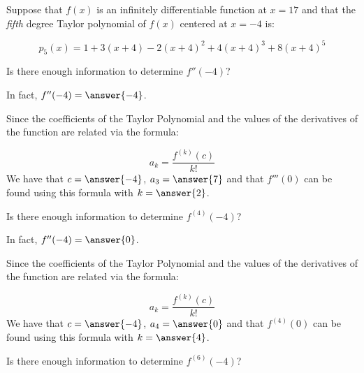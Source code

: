 \documentclass{ximera}
\author{Jim Talamo}
\begin{document}
\begin{exercise}
Suppose that $f(x)$ is an infinitely differentiable function at $x=17$ and that the \emph{fifth} degree Taylor polynomial of $f(x)$ centered at $x=-4$ is:

\[
p_5(x) = 1+3(x+4)-2(x+4)^2+4(x+4)^3+8(x+4)^5
\]

\begin{exercise}
Is there enough information to determine $f''(-4)$?

\begin{multipleChoice}
\end{multipleChoice}
In fact, $f''(-4) = \answer{-4}$.

\begin{hint}
Since the coefficients of the Taylor Polynomial and the values of the derivatives of the function are related via the formula:

\[
a_k = \frac{f^{(k)}(c)}{k!}
\]
We have that $c=\answer{-4}$, $a_3 = \answer{7}$ and that $f'''(0)$ can be found using this formula with $k=
\answer{2}$.   
\end{hint}

\end{exercise}


\begin{exercise}
Is there enough information to determine $f^{(4)}(-4)$?

\begin{multipleChoice}
\end{multipleChoice}
In fact, $f''(-4) = \answer{0}$.

\begin{hint}
Since the coefficients of the Taylor Polynomial and the values of the derivatives of the function are related via the formula:

\[
a_k = \frac{f^{(k)}(c)}{k!}
\]
We have that $c=\answer{-4}$, $a_4 = \answer{0}$ and that $f^{(4)}(0)$ can be found using this formula with $k=
\answer{4}$.   
\end{hint}

\end{exercise}

\begin{exercise}
Is there enough information to determine $f^{(6)}(-4)$?

\begin{multipleChoice}
\end{multipleChoice}



\end{exercise}
\end{exercise}
\end{document}
